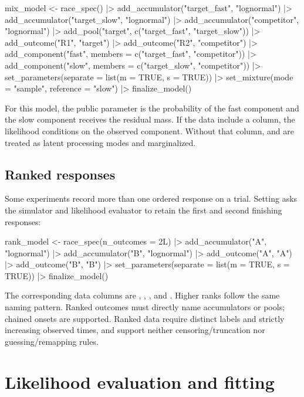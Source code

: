 \documentclass[article]{jss}
\begin{document}
\begin{Code}
mix_model <- race_spec() |>
  add_accumulator("target_fast", "lognormal") |>
  add_accumulator("target_slow", "lognormal") |>
  add_accumulator("competitor", "lognormal") |>
  add_pool("target", c("target_fast", "target_slow")) |>
  add_outcome("R1", "target") |>
  add_outcome("R2", "competitor") |>
  add_component("fast", members = c("target_fast", "competitor")) |>
  add_component("slow", members = c("target_slow", "competitor")) |>
  set_parameters(separate = list(m = TRUE, s = TRUE)) |>
  set_mixture(mode = "sample", reference = "slow") |>
  finalize_model()
\end{Code}

For this model, the public parameter  is the probability of the
fast component and the slow component receives the residual mass. If the data
include a  column, the likelihood conditions on the observed
component. Without that column,  and  are treated as
latent processing modes and marginalized.

\subsection{Ranked responses}

Some experiments record more than one ordered response on a trial. Setting
 asks the simulator and likelihood evaluator to retain
the first and second finishing responses:

\begin{Code}
rank_model <- race_spec(n_outcomes = 2L) |>
  add_accumulator("A", "lognormal") |>
  add_accumulator("B", "lognormal") |>
  add_outcome("A", "A") |>
  add_outcome("B", "B") |>
  set_parameters(separate = list(m = TRUE, s = TRUE)) |>
  finalize_model()
\end{Code}

The corresponding data columns are , , , and
. Higher ranks follow the same naming pattern. Ranked outcomes must
directly name accumulators or pools; chained onsets are supported. Ranked data
require distinct labels and strictly increasing observed times, and support
neither censoring/truncation nor guessing/remapping rules.

\section{Likelihood evaluation and fitting}
\label{sec:likelihood}
\end{document}
